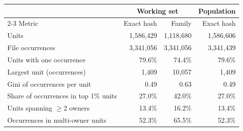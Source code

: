 \begin{tabular}{lrrr}
\toprule
 & \multicolumn{2}{c}{Working set} & Population \\
\cmidrule(lr){2-3}
Metric & Exact hash & Family & Exact hash \\
\midrule
Units & 1,586,429 & 1,118,680 & 1,586,606 \\
File occurrences & 3,341,056 & 3,341,056 & 3,341,439 \\
Units with one occurrence & 79.6\% & 74.4\% & 79.6\% \\
Largest unit (occurrences) & 1,409 & 10,057 & 1,409 \\
Gini of occurrences per unit & 0.49 & 0.63 & 0.49 \\
Share of occurrences in top 1\% units & 27.0\% & 42.0\% & 27.0\% \\
Units spanning $\geq$2 owners & 13.4\% & 16.2\% & 13.4\% \\
Occurrences in multi-owner units & 52.3\% & 65.5\% & 52.3\% \\
\bottomrule
\end{tabular}
